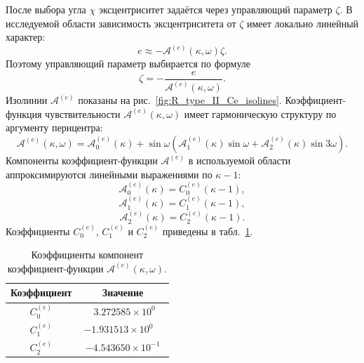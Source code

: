 После выбора угла \(\chi\) эксцентриситет задаётся через управляющий параметр \(\zeta\). В исследуемой области зависимость эксцентриситета от \(\zeta\) имеет локально линейный характер:
\begin{equation}
e \approx -\mathcal A^{(e)}(\kappa,\omega)\zeta.
\end{equation}
Поэтому управляющий параметр выбирается по формуле
\begin{equation}
\zeta=-\frac{e}{\mathcal A^{(e)}(\kappa,\omega)}.
\end{equation}
Изолинии \(\mathcal A^{(e)}\) показаны на рис.~\ref{fig:R_type_II_Ce_isolines}. 
Коэффициент-функция чувствительности \(\mathcal A^{(e)}(\kappa,\omega)\) имеет гармоническую структуру по аргументу перицентра:
\begin{equation}
\mathcal A^{(e)}(\kappa,\omega)
=
\mathcal A_0^{(e)}(\kappa)
+
\sin\omega
\left(
\mathcal A_1^{(e)}(\kappa)\sin\omega
+
\mathcal A_2^{(e)}(\kappa)\sin3\omega
\right).
\end{equation}
Компоненты коэффициент-функции \(\mathcal A^{(e)}\) в используемой области аппроксимируются линейными выражениями по \(\kappa-1\):
\begin{equation}
\mathcal A_0^{(e)}(\kappa)
=
C_0^{(e)}(\kappa-1),
\end{equation}
\begin{equation}
\mathcal A_1^{(e)}(\kappa)
=
C_1^{(e)}(\kappa-1),
\end{equation}
\begin{equation}
\mathcal A_2^{(e)}(\kappa)
=
C_2^{(e)}(\kappa-1).
\end{equation}
Коэффициенты \(C_0^{(e)}\), \(C_1^{(e)}\) и \(C_2^{(e)}\) приведены в табл.~\ref{tab:R_type_II_Ae_coeffs}.

\begin{table}[ht]
	\centering
	\caption{Коэффициенты компонент коэффициент-функции \(\mathcal A^{(e)}(\kappa,\omega)\).}
	\label{tab:R_type_II_Ae_coeffs}
	\begin{tabular}{cc}
		\toprule
		Коэффициент & Значение \\
		\midrule
		\(C_0^{(e)}\) & \(\phantom{-}3.272585\times10^{0\phantom{-}}\) \\
		\(C_1^{(e)}\) & \(-1.931513\times10^{0\phantom{-}}\) \\
		\(C_2^{(e)}\) & \(-4.543650\times10^{-1}\) \\
		\bottomrule
	\end{tabular}
\end{table} 

